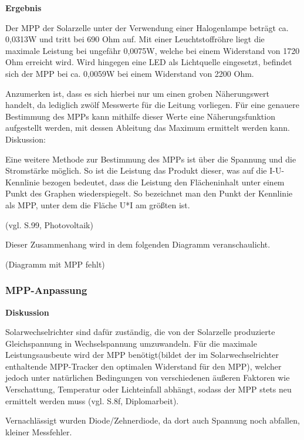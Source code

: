         \vspace{4mm}
        \noindent
        \textbf{Ergebnis}
        \par Der MPP der Solarzelle unter der Verwendung einer Halogenlampe beträgt ca. 0,0313W und tritt bei 690 Ohm auf. Mit einer Leuchtstoffröhre liegt die maximale Leistung bei ungefähr 0,0075W, welche bei einem Widerstand von 1720 Ohm erreicht wird. Wird hingegen eine LED als Lichtquelle eingesetzt, befindet sich der MPP bei ca. 0,0059W bei einem Widerstand von 2200 Ohm.
        \par Anzumerken ist, dass es sich hierbei nur um einen groben Näherungswert handelt, da lediglich zwölf Messwerte für die Leitung vorliegen. Für eine genauere Bestimmung des MPPs kann mithilfe dieser Werte eine Näherungsfunktion aufgestellt werden, mit dessen Ableitung das Maximum ermittelt werden kann. 
        Diskussion:
        \par Eine weitere Methode zur Bestimmung des MPPs ist über die Spannung und die Stromstärke möglich. So ist die Leistung das Produkt dieser, was auf die I-U-Kennlinie bezogen bedeutet, dass die Leistung den Flächeninhalt unter einem Punkt des Graphen wiederspiegelt. So bezeichnet man den Punkt der Kennlinie als MPP, unter dem die Fläche U*I am größten ist. \par (vgl. S.99, Photovoltaik)
        \par Dieser Zusammenhang wird in dem folgenden Diagramm veranschaulicht.
        \par (Diagramm mit MPP fehlt)

    \subsubsection{MPP-Anpassung}                                       %
        \textbf{Diskussion}
        \newline
        \par Solarwechselrichter sind dafür zuständig, die von der Solarzelle produzierte Gleichspannung in Wechselspannung umzuwandeln. Für die maximale Leistungsausbeute wird der MPP benötigt(bildet der im Solarwechselrichter enthaltende MPP-Tracker den optimalen Widerstand für den MPP), welcher jedoch unter natürlichen Bedingungen von verschiedenen äußeren Faktoren wie Verschattung, Temperatur oder Lichteinfall abhängt, sodass der MPP stets neu ermittelt werden muss (vgl. S.8f, Diplomarbeit). 
        \par Vernachlässigt wurden Diode/Zehnerdiode, da dort auch Spannung noch abfallen, kleiner Messfehler.
